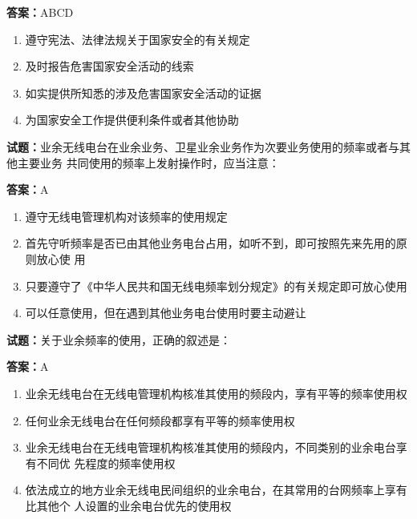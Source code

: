 \documentclass{ctexbook}
\begin{document}
\textbf{答案：}ABCD 

\begin{enumerate}[leftmargin=3em]
  \item 遵守宪法、法律法规关于国家安全的有关规定 

  \item 及时报告危害国家安全活动的线索 

  \item 如实提供所知悉的涉及危害国家安全活动的证据 

  \item 为国家安全工作提供便利条件或者其他协助 

\end{enumerate}





\vspace{1em}

\textbf{试题：}业余无线电台在业余业务、卫星业余业务作为次要业务使用的频率或者与其他主要业务
共同使用的频率上发射操作时，应当注意： 

\textbf{答案：}A 


\begin{enumerate}[leftmargin=3em]
  \item 遵守无线电管理机构对该频率的使用规定 

  \item 首先守听频率是否已由其他业务电台占用，如听不到，即可按照先来先用的原则放心使
用 

  \item 只要遵守了《中华人民共和国无线电频率划分规定》的有关规定即可放心使用 

  \item 可以任意使用，但在遇到其他业务电台使用时要主动避让 

\end{enumerate}





\vspace{1em}

\textbf{试题：}关于业余频率的使用，正确的叙述是： 

\textbf{答案：}A 

\begin{enumerate}[leftmargin=3em]
  \item 业余无线电台在无线电管理机构核准其使用的频段内，享有平等的频率使用权 

  \item 任何业余无线电台在任何频段都享有平等的频率使用权 

  \item 业余无线电台在无线电管理机构核准其使用的频段内，不同类别的业余电台享有不同优
先程度的频率使用权 

  \item 依法成立的地方业余无线电民间组织的业余电台，在其常用的台网频率上享有比其他个
人设置的业余电台优先的使用权 

\end{enumerate}
\end{document}

